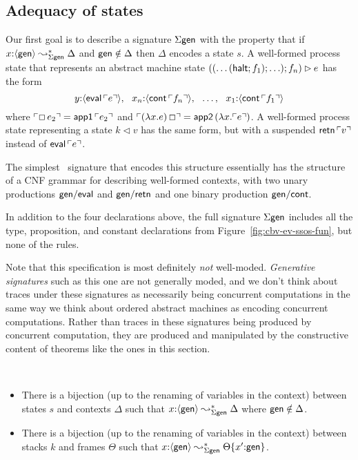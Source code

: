 \subsection{Adequacy of states}
\label{sec:nat-ssos-adequacy-gen}

Our first goal is to describe a signature $\Sigma\sf gen$ with the
property that if $x{:}\langle {\sf gen} \rangle \leadsto^*_{\Sigma\sf gen}
\Delta$ and ${\sf gen} \notin \Delta$ then $\Delta$ encodes a state
$s$. A well-formed process state that represents an abstract machine
state $((\ldots({\sf halt}; f_1); \ldots); f_n) \rhd e$ has the form
\[
y{:}\langle {{\sf eval}\,{\ulcorner{e}\urcorner}} \rangle, ~~
x_n{:}\langle {{\sf cont}\,{\ulcorner{f_n}\urcorner}} \rangle, ~~
\ldots, ~~
x_1{:}\langle {{\sf cont}\,{\ulcorner{f_1}\urcorner}} \rangle
\]
where ${\ulcorner{\Box\,e_2}\urcorner} = {\sf app1}\,{\ulcorner{e_2}\urcorner}$ and
${\ulcorner{(\lambda x.e)\,\Box}\urcorner} = {\sf app2}\,(\lambda x.{\ulcorner{e}\urcorner})$. 
A well-formed process state representing a state $k \lhd v$ has 
the same form, but with a suspended ${\sf retn}\,{\ulcorner{v}\urcorner}$ instead
of ${\sf eval}\,{\ulcorner{e}\urcorner}$. 

The simplest \sls~signature that encodes this structure essentially
has the structure of a CNF grammar for describing well-formed
contexts, with two unary productions ${\sf gen/eval}$ and ${\sf gen/retn}$
and one binary production ${\sf gen/cont}$.

\smallskip
{}
\smallskip

\noindent In addition to the four declarations above, the full
signature $\Sigma\sf gen$ includes all the type, proposition, and
constant declarations from Figure~\ref{fig:cbv-ev-ssos-fun}, but none
of the rules.

Note that this specification is most definitely {\it not} well-moded.
{\it Generative signatures} such as this one are not generally moded,
and we don't think about traces under these signatures as 
necessarily being concurrent computations in the same way we think
about ordered abstract machines as encoding concurrent computations. 
Rather than traces in these signatures being produced by
concurrent computation, they are produced 
and manipulated by the constructive content of
theorems like the ones in this section.

\bigskip
\begin{theorem}~
\label{thm:adequacy-states}
\begin{itemize}
\item There is a bijection (up to the renaming of variables in the context) 
  between states $s$ and contexts $\Delta$ such that
  $x{:}\langle {\sf gen} \rangle \leadsto^*_{\Sigma\sf gen} \Delta$ where 
  ${\sf gen} \notin \Delta$.
\item There is a bijection (up to the renaming of variables in the context) 
  between stacks $k$ and frames $\Theta$ such that $x{:}\langle {\sf
    gen} \rangle \leadsto^*_{\Sigma\sf gen} {\Theta}\{{x'{:}{\sf gen}}\}$.
\end{itemize}
\end{theorem}

